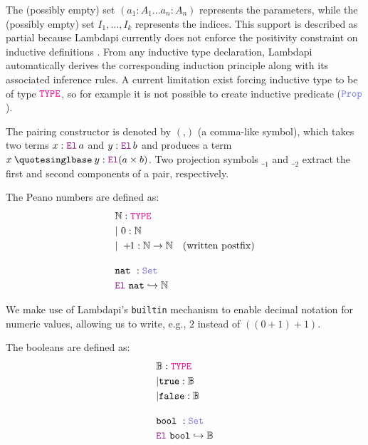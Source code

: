 The (possibly empty) set $(a_1 : A_1 \dots a_n : A_n)$ represents the parameters, while the (possibly empty) set $I_1, \dots, I_k$ represents the indices.
This support is described as partial because Lambdapi currently does not enforce the positivity constraint on inductive definitions \cite[\S 2.2]{inductive-type}.
From any inductive type declaration, Lambdapi automatically derives the corresponding induction principle along with its associated inference rules.
A current limitation exist forcing inductive type to be of type $\type$, so for example it is not possible to create inductive predicate ($\prop$).

The pairing constructor is denoted by $(‚)$ (a comma-like symbol), which takes two terms $x : \el\,a$ and $y : \el\, b$ and produces a term $x \mathbin{‚} y : \el (a \times b)$.
Two projection symbols ${\_}_1$ and ${\_}_2$ extract the first and second components of a pair, respectively.


\begin{definition}[Natural]\label{def-nat}
The Peano numbers are defined as:
\begin{align*}
&\N: \type \\
&|~0 : \N \\
&|~+\!\!1: \N \ra \N \quad \text{(written postfix)} \\[1em]
& \kw{nat}~: \set \\
&  \el~\kw{nat} \re \N
\end{align*}
\end{definition}

We make use of Lambdapi's \lstinline[language=Lambdapi,basicstyle=\ttfamily\footnotesize]|builtin| mechanism to enable decimal notation for numeric values, allowing us to write, e.g., $2$ instead of $((0 +\!\!1) +\!\!1)$.

\begin{definition}[Boolean]\label{def-bool}
The booleans are defined as:
\begin{align*}
&\B: \type \\
&| \true : \B \\
&| \false : \B \\[1em]
& \kw{bool}~: \set \\
&  \el~\kw{bool} \re \B
\end{align*}
\end{definition}

